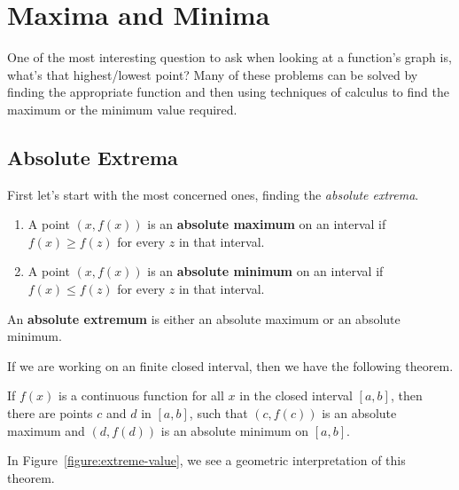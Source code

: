 \chapter{Maxima and Minima}

One of the most interesting question to ask when looking at a function's graph is, what's that highest/lowest point? Many of these problems can be solved by finding the appropriate function and then using techniques of calculus to find the maximum or the minimum value required.

\section{Absolute Extrema}

First let's start with the most concerned ones, finding the
\textit{absolute extrema}.

\begin{definition}\hfil
    \begin{enumerate}
    \item A point $(x,f(x))$ is an \textbf{absolute maximum} on an interval
      if $f(x)\ge f(z)$ for every $z$ in that interval.
    \item A point $(x,f(x))$ is an \textbf{absolute minimum} on an interval if
      $f(x)\le f(z)$ for every $z$ in that interval.
    \end{enumerate}
    An \textbf{absolute extremum} is either an absolute maximum or an absolute minimum.
    \\\cite{mooc}
\end{definition}

If we are working on an finite closed interval, then we have the
following theorem. \cite{mooc}

\begin{theorem}\label{theorem:evt}
If $f(x)$ is a continuous function for all $x$ in the closed interval
$[a,b]$, then there are points $c$ and $d$ in $[a,b]$, such that
$(c,f(c))$ is an absolute maximum and $(d,f(d))$ is an absolute
minimum on $[a, b]$.
\\\cite{mooc}
\end{theorem}

In Figure~\ref{figure:extreme-value}, we see a geometric
interpretation of this theorem. 

